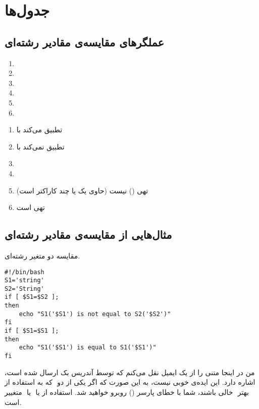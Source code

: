 \chapter{جدول‌ها}
\section*{عملگرهای مقایسه‌ی مقادیر رشته‌ای}
\begin{enumerate}
\item{}
\item{}
\item{}
\item{}
\item{}
\item{}
\end{enumerate}

\begin{enumerate}
\item{ تطبیق می‌کند با }
\item{ تطبیق نمی‌کند با }
\item{}
\item{}
\item{ تهی () نیست (حاوی یک یا چند کاراکتر است)}
\item{ تهی است}
\end{enumerate}

\section*{مثال‌هایی از مقایسه‌ی مقادیر رشته‌ای}
مقایسه دو متغیر رشته‌ای.
\begin{latin}
\begin{lstlisting}
#!/bin/bash
S1='string'
S2='String'
if [ $S1=$S2 ];
then
	echo "S1('$S1') is not equal to S2('$S2')"
fi
if [ $S1=$S1 ];
then
	echo "S1('$S1') is equal to S1('$S1')"
fi
\end{lstlisting}
\end{latin}

من در اینجا متنی را از یک ایمیل نقل می‌کنم‌ که توسط آندریس بک‌ ارسال شده است، که به
استفاده از ‎ اشاره دارد. این ایده‌ی خوبی نیست‌، به این صورت که اگر یکی
از دو متغییر ‎ یا ‎ خالی‌ باشند، شما با خطای پارسر () روبرو خواهید
شد‌. استفاده از  یا ‎ بهتر است‌.


